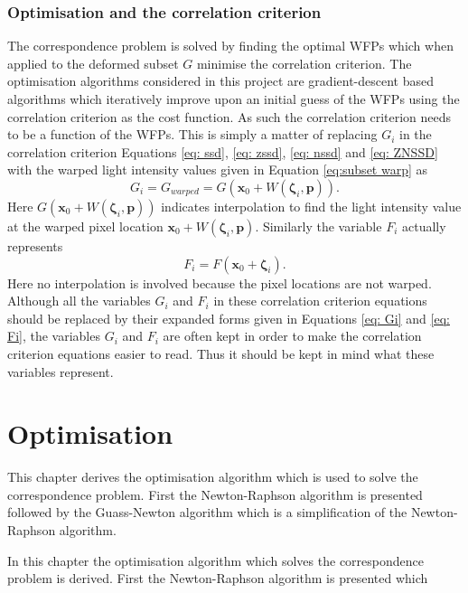 \documentclass[12pt,oneside,openany,a4paper, %
english, %
masters-t, goldenblock]{usthesis}
\begin{document}
\subsection{Optimisation and the correlation criterion}
The correspondence problem is solved by finding the optimal WFPs which when applied to the deformed subset $G$ minimise the correlation criterion. The optimisation algorithms considered in this project are gradient-descent based algorithms which iteratively improve upon an initial guess of the WFPs using the correlation criterion as the cost function. As such the correlation criterion needs to be a function of the WFPs. This is simply a matter of replacing $G_i$ in the correlation criterion Equations \ref{eq: ssd}, \ref{eq: zssd}, \ref{eq: nssd} and \ref{eq: ZNSSD} with the warped light intensity values given in Equation \ref{eq:subset warp} as
\begin{equation}
  G_i = G_{warped} = G(\bm{x}_0 +W(\bm{\zeta}_i,\bm{p})). \label{eq: Gi}
\end{equation}
Here $G(\bm{x}_0 +W(\bm{\zeta}_i,\bm{p}))$ indicates interpolation to find the light intensity value at the warped pixel location $\bm{x}_0 +W(\bm{\zeta}_i,\bm{p})$. Similarly the variable $F_i$ actually represents 
\begin{equation}
  F_i = F(\bm{x}_0 +\bm{\zeta}_i). \label{eq: Fi}
\end{equation}
Here no interpolation is involved because the pixel locations are not warped. Although all the variables $G_i$ and $F_i$ in these correlation criterion equations should be replaced by their expanded forms given in Equations \ref{eq: Gi} and \ref{eq: Fi}, the variables $G_i$ and $F_i$ are often kept in order to make the correlation criterion equations easier to read. Thus it should be kept in mind what these variables represent. 

\chapter{Optimisation}
This chapter derives the optimisation algorithm which is used to solve the correspondence problem. First the Newton-Raphson algorithm is presented followed by the Guass-Newton algorithm which is a simplification of the Newton-Raphson algorithm.

In this chapter the optimisation algorithm which solves the correspondence problem is derived. First the Newton-Raphson algorithm is presented which 
\end{document}
